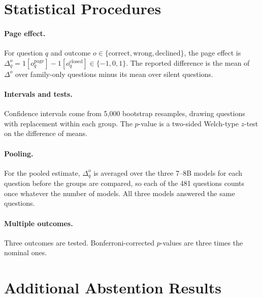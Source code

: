 \documentclass[letterpaper]{article} %
\begin{document}
\section{Statistical Procedures}

\paragraph{Page effect.}
For question $q$ and outcome $o \in \{\text{correct}, \text{wrong},
\text{declined}\}$, the page effect is $\Delta_q^o = 1[o_q^{\text{page}}] -
1[o_q^{\text{closed}}] \in \{-1, 0, 1\}$. The reported difference is the mean
of $\Delta^o$ over family-only questions minus its mean over silent questions.

\paragraph{Intervals and tests.}
Confidence intervals come from 5,000 bootstrap resamples, drawing questions
with replacement within each group. The $p$-value is a two-sided Welch-type
$z$-test on the difference of means.

\paragraph{Pooling.}
For the pooled estimate, $\Delta_q^o$ is averaged over the three 7--8B models
for each question before the groups are compared, so each of the 481 questions
counts once whatever the number of models. All three models answered the same
questions.

\paragraph{Multiple outcomes.}
Three outcomes are tested. Bonferroni-corrected $p$-values are three times the
nominal ones.

\section{Additional Abstention Results}
\end{document}
